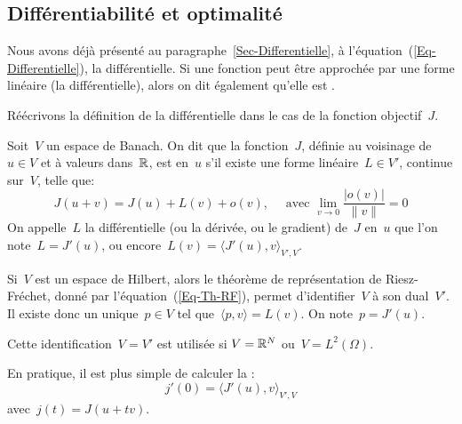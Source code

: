 \medskip
\subsection{Différentiabilité et optimalité}

Nous avons déjà présenté au paragraphe~\ref{Sec-Differentielle}, à l'équation~(\ref{Eq-Differentielle}), la différentielle. Si une fonction peut être approchée par une forme linéaire (la différentielle), alors on dit également qu'elle est .

Réécrivons la définition de la différentielle dans le cas de la fonction objectif~$J$.
\begin{definition}
Soit~$V$ un espace de Banach. On dit que la fonction~$J$, définie au voisinage de~$u\in V$ et à valeurs dans~$\mathbb R$, est  en~$u$ s'il existe une forme linéaire~$L\in V'$, continue sur~$V$, telle que:
\begin{equation}
J(u+v) = J(u) + L(v) + o(v), \quad \text{ avec } \lim_{v\rightarrow0} \dfrac{|o(v)|}{\|v\|}=0
\end{equation}
On appelle~$L$ la différentielle (ou la dérivée, ou le gradient) de~$J$ en~$u$ que l'on note~$L=J'(u)$, ou encore~$L(v)=\langle J'(u),v\rangle_{V',V}$.
\end{definition}
\begin{remarque}[Remarques]
Si~$V$ est un espace de Hilbert, alors le théorème de représentation de Riesz-Fréchet, donné par l'équation~(\ref{Eq-Th-RF}), permet d'identifier~$V$ à son dual~$V'$. Il existe donc un unique~$p\in V$ tel que~$\langle p,v\rangle = L(v)$. On note~$p=J'(u)$.
\par\noindent
Cette identification~$V=V'$ est utilisée si $V=\mathbb R^N$ ou~$V=L^2(\Omega)$.
\par\noindent{}
En pratique, il est plus simple de calculer la :
\begin{equation}
j'(0) = \langle J'(u),v\rangle_{V',V}
\end{equation}
avec~$j(t)=J(u+tv)$.
\end{remarque}

